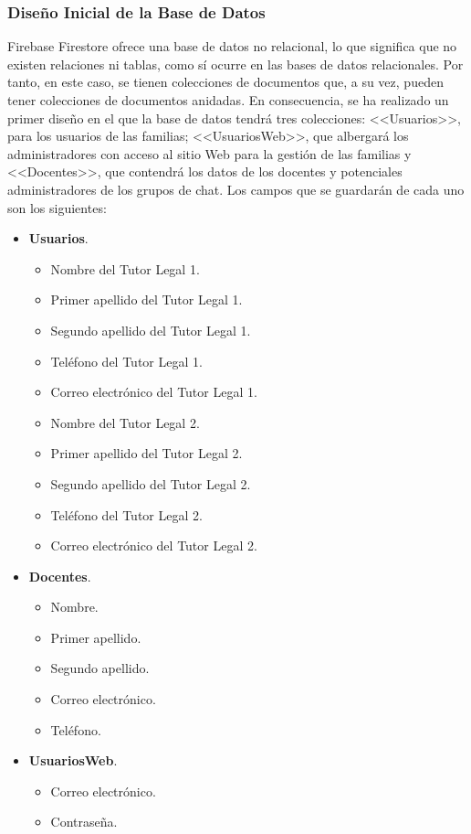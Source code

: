 \subsubsection{Diseño Inicial de la Base de Datos}
Firebase Firestore ofrece una base de datos no relacional, lo que significa que no existen relaciones ni tablas, como sí ocurre en las bases de datos relacionales. Por tanto, en este caso, se tienen colecciones de documentos que, a su vez, pueden tener colecciones de documentos anidadas. En consecuencia, se ha realizado un primer diseño en el que la base de datos tendrá tres colecciones: <<Usuarios>>, para los usuarios de las familias; <<UsuariosWeb>>, que albergará los administradores con acceso al sitio Web para la gestión de las familias y <<Docentes>>, que contendrá los datos de los docentes y potenciales administradores de los grupos de chat. Los campos que se guardarán de cada uno son los siguientes:

\begin{itemize}
	\item \textbf{Usuarios}.
		\begin{itemize}
			\item Nombre del Tutor Legal 1.
			\item Primer apellido del Tutor Legal 1.
			\item Segundo apellido del Tutor Legal 1.
			\item Teléfono del Tutor Legal 1.
			\item Correo electrónico del Tutor Legal 1.
			\item Nombre del Tutor Legal 2.
			\item Primer apellido del Tutor Legal 2.
			\item Segundo apellido del Tutor Legal 2.
			\item Teléfono del Tutor Legal 2.
			\item Correo electrónico del Tutor Legal 2.
		\end{itemize}
		
	\item \textbf{Docentes}.
		\begin{itemize}
			\item Nombre.
			\item Primer apellido.
			\item Segundo apellido.
			\item Correo electrónico.
			\item Teléfono.
		\end{itemize}
		
	\item \textbf{UsuariosWeb}.
		\begin{itemize}
			\item Correo electrónico.
			\item Contraseña.
		\end{itemize}
		
\end{itemize}

